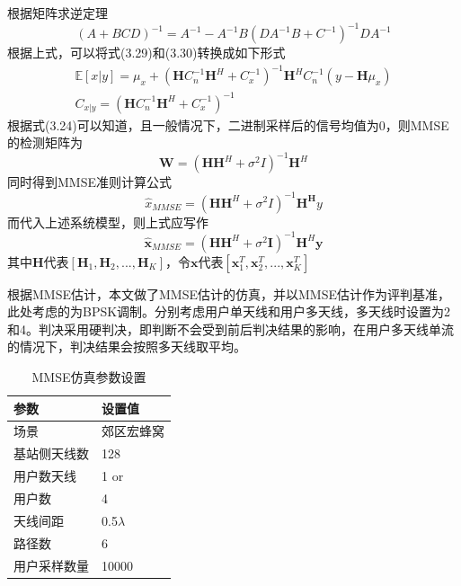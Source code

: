 \documentclass[bachelor,nocolorlinks, printoneside]{seuthesis} %
\begin{document}
\begin{Main}
根据矩阵求逆定理
\begin{equation}\label{key}
(A + BCD)^{-1} = A^{-1} - A^{-1}B(DA^{-1}B+C^{-1})^{-1}DA^{-1}
\end{equation}
根据上式，可以将式(3.29)和(3.30)转换成如下形式
\begin{gather}\label{key}
\mathbb{E}[x|y] = \mu_{x} + (\mathbf{H}C_n^{-1}\mathbf{H}^H + C_x^{-1})^{-1}\mathbf{H}^H C_n^{-1}(y-\mathbf{H}\mu_{x}) \\ 
C_{x|y} = (\mathbf{H} C_n^{-1} \mathbf{H}^H + C_x^{-1})^{-1}
\end{gather}
根据式(3.24)可以知道，且一般情况下，二进制采样后的信号均值为0，则MMSE的检测矩阵为
\begin{equation}\label{key}
\mathbf{W} = ({\mathbf{H}}{\mathbf{H}}^H + \sigma^2 {I})^{-1}{\mathbf{H}}^H
\end{equation}
同时得到MMSE准则计算公式
\begin{equation}\label{key}
\hat{x}_{MMSE} = (\mathbf{H}\mathbf{H}^H + \sigma^2 I)^{-1}\mathbf{H}^\mathbf{H} y
\end{equation}
而代入上述系统模型，则上式应写作
\begin{equation}\label{key}
\hat{\mathbf{x}}_{MMSE} = (\mathbf{H}\mathbf{H}^H + \sigma^2 \mathbf{I})^{-1}\mathbf{H}^H \mathbf{y}
\end{equation}
其中$\mathbf{H}$代表$[\mathbf{H}_1,\mathbf{H}_2,...,\mathbf{H}_K]$，令$\mathbf{x}$代表$[\mathbf{x}_1^T,\mathbf{x}_2^T,...,\mathbf{x}_K^T]$


根据MMSE估计，本文做了MMSE估计的仿真，并以MMSE估计作为评判基准，此处考虑的为BPSK调制。分别考虑用户单天线和用户多天线，多天线时设置为2和4。判决采用硬判决，即判断不会受到前后判决结果的影响，在用户多天线单流的情况下，判决结果会按照多天线取平均。
\begin{table}[htbp]
	\centering
	\caption{\label{tab:test}MMSE仿真参数设置}
	\begin{tabular}{ll}
		\toprule
		参数 &  设置值 \\
		\bottomrule
		场景 &  郊区宏蜂窝 \\
		\bottomrule
		基站侧天线数 & 128 \\
		\bottomrule
		用户数天线	& 1 \quad or\quad2 \\
		\bottomrule
		用户数	& 4 \\
		\bottomrule
		天线间距 & 0.5$\lambda$ \\
		\bottomrule
		路径数 & 6 \\
		\bottomrule
		用户采样数量 & 10000 \\
		\bottomrule
	\end{tabular}
\end{table}


\end{Main}
\end{document}
